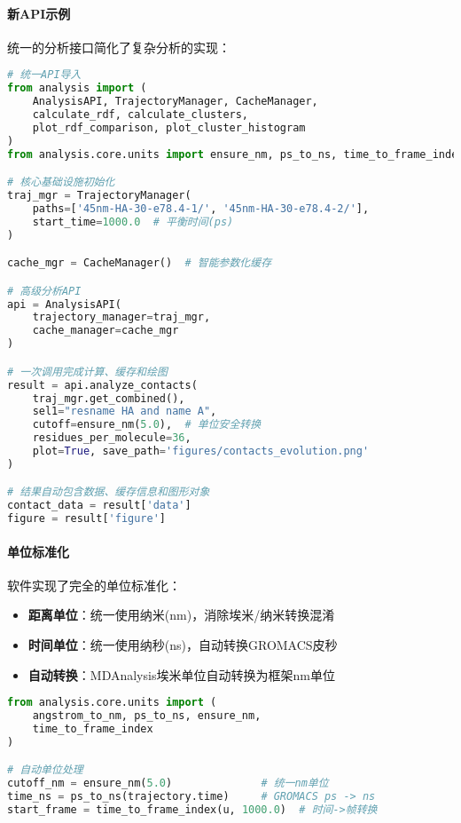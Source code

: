 \paragraph{新API示例}

统一的分析接口简化了复杂分析的实现：

\begin{lstlisting}[language=python,style=blockstyle]
# 统一API导入
from analysis import (
    AnalysisAPI, TrajectoryManager, CacheManager,
    calculate_rdf, calculate_clusters, 
    plot_rdf_comparison, plot_cluster_histogram
)
from analysis.core.units import ensure_nm, ps_to_ns, time_to_frame_index

# 核心基础设施初始化
traj_mgr = TrajectoryManager(
    paths=['45nm-HA-30-e78.4-1/', '45nm-HA-30-e78.4-2/'],
    start_time=1000.0  # 平衡时间(ps)
)

cache_mgr = CacheManager()  # 智能参数化缓存

# 高级分析API
api = AnalysisAPI(
    trajectory_manager=traj_mgr,
    cache_manager=cache_mgr
)

# 一次调用完成计算、缓存和绘图
result = api.analyze_contacts(
    traj_mgr.get_combined(),
    sel1="resname HA and name A",
    cutoff=ensure_nm(5.0),  # 单位安全转换
    residues_per_molecule=36,
    plot=True, save_path='figures/contacts_evolution.png'
)

# 结果自动包含数据、缓存信息和图形对象
contact_data = result['data']
figure = result['figure']
\end{lstlisting}

\paragraph{单位标准化}

软件实现了完全的单位标准化：

\begin{itemize}
    \item \textbf{距离单位}：统一使用纳米(nm)，消除埃米/纳米转换混淆
    \item \textbf{时间单位}：统一使用纳秒(ns)，自动转换GROMACS皮秒
    \item \textbf{自动转换}：MDAnalysis埃米单位自动转换为框架nm单位
\end{itemize}

\begin{lstlisting}[language=python,style=blockstyle]
from analysis.core.units import (
    angstrom_to_nm, ps_to_ns, ensure_nm, 
    time_to_frame_index
)

# 自动单位处理
cutoff_nm = ensure_nm(5.0)              # 统一nm单位
time_ns = ps_to_ns(trajectory.time)     # GROMACS ps -> ns
start_frame = time_to_frame_index(u, 1000.0)  # 时间->帧转换
\end{lstlisting}

